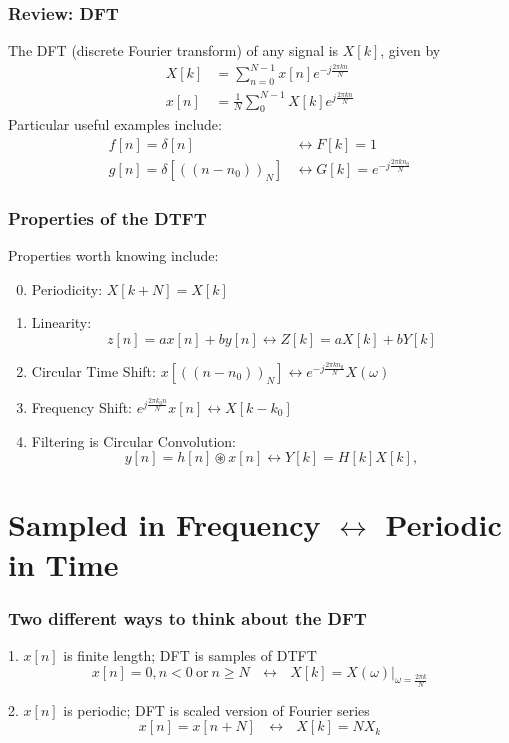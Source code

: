 \documentclass{beamer}
\begin{document}
\begin{frame}
  \frametitle{Review: DFT}

  The DFT (discrete Fourier transform) of any signal is
  $X[k]$, given by
  \begin{align*}
    X[k] &= \sum_{n=0}^{N-1} x[n]e^{-j\frac{2\pi kn}{N}}\\
    x[n] &= \frac{1}{N}\sum_0^{N-1} X[k]e^{j\frac{2\pi kn}{N}}
  \end{align*}
  Particular useful examples include:
  \begin{align*}
    f[n]=\delta[n] &\leftrightarrow F[k]=1\\
    g[n]=\delta\left[(\!(n-n_0)\!)_N\right] &\leftrightarrow G[k]=e^{-j\frac{2\pi kn_0}{N}}
  \end{align*}
\end{frame}

\begin{frame}
  \frametitle{Properties of the DTFT}

  Properties worth knowing  include:
  \begin{enumerate}
    \setcounter{enumi}{-1}
  \item Periodicity: $X[k+N]=X[k]$
  \item Linearity:
    \[z[n]=ax[n]+by[n]\leftrightarrow Z[k]=aX[k]+bY[k]
    \]
  \item Circular Time Shift: $x\left[(\!(n-n_0)\!)_N\right]\leftrightarrow e^{-j\frac{2\pi kn_0}{N}}X(\omega)$
  \item Frequency Shift: $e^{j\frac{2\pi k_0 n}{N}}x[n]\leftrightarrow X[k-k_0]$
  \item Filtering is Circular Convolution:
    \[
      y[n]=h[n]\circledast x[n]\leftrightarrow Y[k]=H[k]X[k],
      \]
  \end{enumerate}
\end{frame}

\section[Periodic in Time]{Sampled in Frequency $\leftrightarrow$ Periodic in Time}
\setcounter{subsection}{1}

\begin{frame}
  \frametitle{Two different ways to think about the DFT}
  \begin{block}{1. $x[n]$ is finite length; DFT is samples of DTFT}
    \begin{displaymath}
      x[n]=0,n<0~\text{or}~n\ge N~~~\leftrightarrow~~~X[k]=\left.X(\omega)\right|_{\omega=\frac{2\pi k}{N}}
    \end{displaymath}
  \end{block}
  \begin{block}{2. $x[n]$ is periodic; DFT is scaled version of Fourier series}
    \begin{displaymath}
      x[n]=x[n+N]~~~\leftrightarrow~~~X[k]=N X_k
    \end{displaymath}
  \end{block}
\end{frame}
\end{document}
